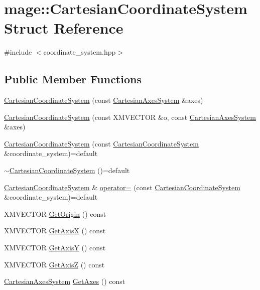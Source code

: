 \hypertarget{structmage_1_1_cartesian_coordinate_system}{}\section{mage\+:\+:Cartesian\+Coordinate\+System Struct Reference}
\label{structmage_1_1_cartesian_coordinate_system}


{\ttfamily \#include $<$coordinate\+\_\+system.\+hpp$>$}

\subsection*{Public Member Functions}
\begin{DoxyCompactItemize}
\item 
\hyperlink{structmage_1_1_cartesian_coordinate_system_a3f4a3309daccc818f06400a44f70b09b}{Cartesian\+Coordinate\+System} (const \hyperlink{structmage_1_1_cartesian_axes_system}{Cartesian\+Axes\+System} \&axes)
\item 
\hyperlink{structmage_1_1_cartesian_coordinate_system_a322dc634c9192c1d1f3f4872e6255b91}{Cartesian\+Coordinate\+System} (const X\+M\+V\+E\+C\+T\+OR \&o, const \hyperlink{structmage_1_1_cartesian_axes_system}{Cartesian\+Axes\+System} \&axes)
\item 
\hyperlink{structmage_1_1_cartesian_coordinate_system_a1f580b96edaae45356510208c187c1e2}{Cartesian\+Coordinate\+System} (const \hyperlink{structmage_1_1_cartesian_coordinate_system}{Cartesian\+Coordinate\+System} \&coordinate\+\_\+system)=default
\item 
\hyperlink{structmage_1_1_cartesian_coordinate_system_a86effcef63e455323c194063c0f1fd46}{$\sim$\+Cartesian\+Coordinate\+System} ()=default
\item 
\hyperlink{structmage_1_1_cartesian_coordinate_system}{Cartesian\+Coordinate\+System} \& \hyperlink{structmage_1_1_cartesian_coordinate_system_acf9dab4edc5c07b5bbf6bee0bdfe317c}{operator=} (const \hyperlink{structmage_1_1_cartesian_coordinate_system}{Cartesian\+Coordinate\+System} \&coordinate\+\_\+system)=default
\item 
X\+M\+V\+E\+C\+T\+OR \hyperlink{structmage_1_1_cartesian_coordinate_system_ac413d8f94f94102faa47d7c5cf8813b9}{Get\+Origin} () const
\item 
X\+M\+V\+E\+C\+T\+OR \hyperlink{structmage_1_1_cartesian_coordinate_system_ad79c4e6ae091d2a0268f1b9c1f06b7b2}{Get\+AxisX} () const
\item 
X\+M\+V\+E\+C\+T\+OR \hyperlink{structmage_1_1_cartesian_coordinate_system_a793c9783db21865ccf55f153cca963f3}{Get\+AxisY} () const
\item 
X\+M\+V\+E\+C\+T\+OR \hyperlink{structmage_1_1_cartesian_coordinate_system_ac152628841e8a51092b785bf62a64d98}{Get\+AxisZ} () const
\item 
\hyperlink{structmage_1_1_cartesian_axes_system}{Cartesian\+Axes\+System} \hyperlink{structmage_1_1_cartesian_coordinate_system_a291ba9d21e78af511bdd6358b3502eb4}{Get\+Axes} () const
\end{DoxyCompactItemize}
